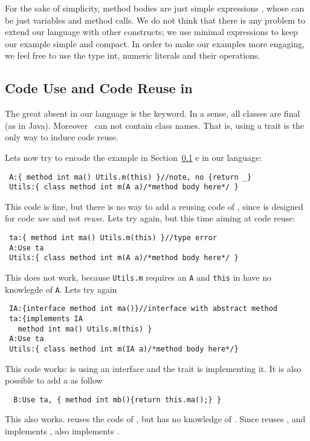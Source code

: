 For the sake of simplicity, method bodies are just simple expressions \me, whose can be just variables and method calls.
We do not think that there is any problem to extend our language with other constructs; we use minimal expressions to keep our example simple and compact. In order to make our examples more engaging, we feel free to use the type int, numeric literals and their operations.

\subsection{Code Use and Code Reuse in \name}

The great absent in our language is the  \Q@extends@ keyword.
In a sense, all classes are final (as in Java).
Moreover  \use\ can not contain class names.
That is, using a trait is the only way to induce code reuse.

Lets now try to encode the example in Section~\ref{} e in our language:

\begin{lstlisting}
 A:{ method int ma() Utils.m(this) }//note, no {return _}
 Utils:{ class method int m(A a)/*method body here*/ }
\end{lstlisting} 

This code is fine, but there is no way to add a \Q@B@ reusing code of \Q@A@, since
\Q@A@ is designed for code \emph{use} and not \emph{reuse}. Lets try
again, but this time aiming at code reuse:

\begin{lstlisting}
 ta:{ method int ma() Utils.m(this) }//type error
 A:Use ta
 Utils:{ class method int m(A a)/*method body here*/ }
\end{lstlisting}

This does not work, because \lstinline{Utils.m} requires an \lstinline{A} and \lstinline{this} in
\Q@ta@ have no knowlegde of \lstinline{A}. Lets try again

\begin{lstlisting}
 IA:{interface method int ma()}//interface with abstract method
 ta:{implements IA
   method int ma() Utils.m(this) }
 A:Use ta
 Utils:{ class method int m(IA a)/*method body here*/}
\end{lstlisting}

This code works: \Q@Utils@ is using an interface \Q@IA@ and the trait \Q@ta@
is implementing it. It is also possible to add a \Q@B@ as follow
\begin{lstlisting}
  B:Use ta, { method int mb(){return this.ma();} }
\end{lstlisting}
This also works.  \Q@B@ reuses the code of \Q@ta@, but has no knowledge of \Q@A@.
Since \Q@B@ reuses \Q@ta@, and \Q@ta@ implements \Q@IA@, also \Q@B@ implements \Q@IA@. 

